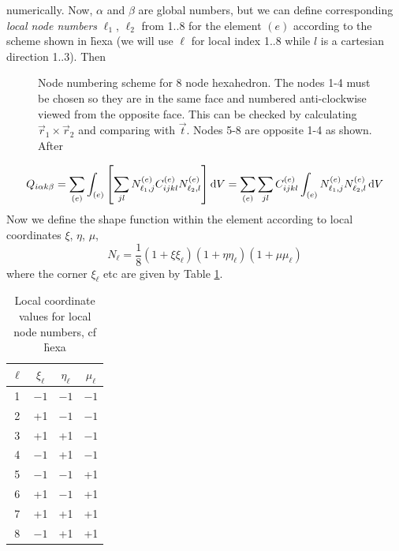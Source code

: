 \documentclass[a4paper]{article}
\begin{document}
numerically. Now, $\alpha$ and $\beta$ are global numbers, but we can
define corresponding \emph{local node numbers} $\ell_1$, $\ell_2$ from
1..8 for the element $(e)$ according to the scheme shown in \f{hexa}
(we will use $\ell$ for local index 1..8 while $l$ is a cartesian
direction 1..3). Then
%
\begin{figure}
  \caption{Node numbering scheme for 8 node hexahedron. The nodes 1-4
  must be chosen so they are in the same face and numbered
  anti-clockwise viewed from the opposite face. This can be checked by
  calculating $\vec r_1\times\vec r_2$ and comparing with $\vec
  t$. Nodes 5-8 are opposite 1-4 as shown. After \cite{afem}}
  \label{hexa}
\end{figure}
%
\begin{equation}
  Q_{i\alpha k\beta}=\sum_{(e)}\int_{(e)} \left[\sum_{jl} 
N_{\ell_1,j}^{(e)} C_{ijkl}^{(e)} N_{\ell_2,l}^{(e)}\right]\mathrm{d} V=
\sum_{(e)}\sum_{jl}C_{ijkl}^{(e)}\int_{(e)} N_{\ell_1,j}^{(e)}N_{\ell_2,l}^{(e)}
\,\mathrm{d} V
\label{Qcomp}
\end{equation}
Now we define the shape function within the element according to local
coordinates $\xi$, $\eta$, $\mu$,
\begin{equation}
  N_\ell=\frac18(1+\xi\xi_\ell)(1+\eta\eta_\ell)(1+\mu\mu_\ell)
\end{equation}
where the corner $\xi_\ell$ etc are given by Table \ref{corner}.
\begin{table}
  \begin{tabular}{cccc}
    $\ell$ & $\xi_\ell$ & $\eta_\ell$ & $\mu_\ell$ \\ \hline
1 & $-1$ & $-1$ & $-1$ \\
2 & +1 & $-1$ & $-1$ \\
3 & +1 & +1 & $-1$ \\
4 & $-1$ & +1 & $-1$ \\
5 & $-1$ & $-1$ & +1 \\
6 & +1 & $-1$ & +1 \\
7 & +1 & +1 & +1 \\
8 & $-1$ & +1 & +1
  \end{tabular}
\caption{Local coordinate values for local node numbers, cf \f{hexa}}
\label{corner}
\end{table}
\end{document}
